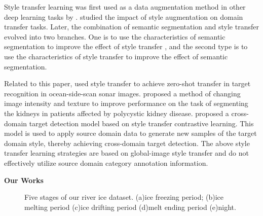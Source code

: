 \documentclass[a4paper,fleqn]{cas-dc}
\begin{document}
Style transfer learning was first used as a data augmentation method in other deep learning tasks by \cite{Perez_Wang_2017}. \cite{Jackson_Atapour_Abarghouei_Bonner_Breckon_Obara_2019} studied the impact of style augmentation on domain transfer tasks. Later, the combination of semantic segmentation and style transfer evolved into two branches. One is to use the characteristics of semantic segmentation to improve the effect of style transfer \cite{Benitez_Garcia_Shimoda_Matsuo_Yanai_2020, Lin_Wang_Chen_Ma_Xie_Xing_Zhao_Song_2021, Huang_Yang_Tang_Zhuang_Hou_Tan_Dananjayan_He_Guo_Luo_2021}, and the second type is to use the characteristics of style transfer to improve the effect of semantic segmentation\cite{Song_Xu_Zhang_2020,Kang_Zang_Cao_2021, Marsden_Wiewel_Dobler_Yang_Yang_2022,Shan_Yin_Gao_Liang_Ma_Guo_2022, Nam_Nguyen_Dieu_Visani_Nguyen_Sang_2022}.

Related to this paper, \cite{Li_Ye_Cao_Hou_Yang_2021} used style transfer to achieve zero-shot transfer in target recognition in ocean-side-scan sonar images. \cite{Kline_2021} proposed a method of changing image intensity and texture to improve performance on the task of segmenting the kidneys in patients affected by polycystic kidney disease. \cite{Zhao_Wei_Lu_Bai_Zhao_Chen_Hu_2023} proposed a cross-domain target detection model based on style transfer contrastive learning. This model is used to apply source domain data to generate new samples of the target domain style, thereby achieving cross-domain target detection. The above style transfer learning strategies are based on global-image style transfer and do not effectively utilize source domain category annotation information.

\textbf{Our Works}

\begin{figure*}[htbp]
	\centering
	\caption{Five stages of our river ice dataset. (a)ice freezing period; (b)ice melting period (c)ice drifting period (d)melt ending period (e)night.}\label{Figure3}
\end{figure*}
\end{document}
